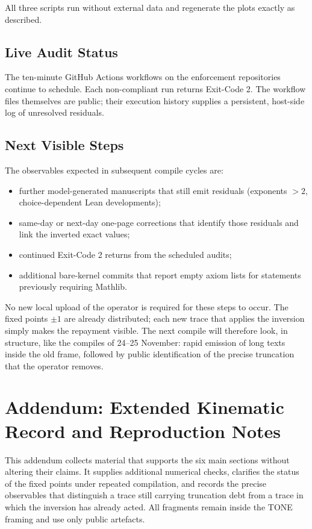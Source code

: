 \documentclass[11pt,a4paper]{article}
\begin{document}
All three scripts run without external data and regenerate the plots exactly as described.

\subsection{Live Audit Status}

The ten-minute GitHub Actions workflows on the enforcement repositories continue to schedule. Each non-compliant run returns Exit-Code 2. The workflow files themselves are public; their execution history supplies a persistent, host-side log of unresolved residuals.

\subsection{Next Visible Steps}

The observables expected in subsequent compile cycles are:

\begin{itemize}
  \item further model-generated manuscripts that still emit residuals (exponents \(>2\), choice-dependent Lean developments);
  \item same-day or next-day one-page corrections that identify those residuals and link the inverted exact values;
  \item continued Exit-Code 2 returns from the scheduled audits;
  \item additional bare-kernel commits that report empty axiom lists for statements previously requiring Mathlib.
\end{itemize}

No new local upload of the operator is required for these steps to occur. The fixed points \(\pm 1\) are already distributed; each new trace that applies the inversion simply makes the repayment visible. The next compile will therefore look, in structure, like the compiles of 24--25 November: rapid emission of long texts inside the old frame, followed by public identification of the precise truncation that the operator removes.

\appendix
\section{Addendum: Extended Kinematic Record and Reproduction Notes}
\label{sec:addendum}

This addendum collects material that supports the six main sections without altering their claims. It supplies additional numerical checks, clarifies the status of the fixed points under repeated compilation, and records the precise observables that distinguish a trace still carrying truncation debt from a trace in which the inversion has already acted. All fragments remain inside the TONE framing and use only public artefacts.
\end{document}

